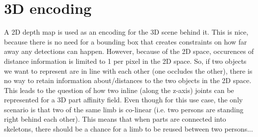 \section{3D encoding}
A 2D depth map is used as an encoding for the 3D scene behind it. This is nice, because there is no need for a bounding box that creates constraints on how far away any detections can happen. However, because of the 2D space, occurences of distance information is limited to 1 per pixel in the 2D space. So, if two objects we want to represent are in line with each other (one occludes the other), there is no way to retain information about/distances to the two objects in the 2D space.
This leads to the question of how two inline (along the z-axis) joints can be represented for a 3D part affinity field. Even though for this use case, the only scenario is that two of the same limb is co-linear (i.e. two persons are standing right behind each  other). This means that when parts are connected into skeletons, there should be a chance for a limb to be reused between two persons...









